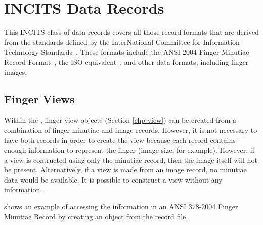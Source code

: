 \section{INCITS Data Records}
\label{sec-incitsdatarecords}

This INCITS class of data records covers all those record formats that are
derived from the standards defined by the InterNational Committee for
Information Technology Standards~\cite{incits}. These formats include the
ANSI-2004 Finger Minutiae Record Format~\cite{std:ansi378-2004}, the ISO
equivalent~\cite{std:iso19794-2}, and other data formats, including finger
images.

\subsection{Finger Views}
\label{sec-incitsfingerviews}
Within the \sname, finger view objects (Section \ref{chp-view}) can be 
created from a combination of finger minutiae and image records. However, it
is not necessary to have both records in order to create the view because each
record contains enough information to represent the finger (image size, for
example). However, if a view is contructed using only the minutiae record, then
the image itself will not be present. Alternatively, if a view is made from
an image record, no minutiae data would be available. It is possible to
construct a view without any information.

 shows an example of accessing the information
in an ANSI 378-2004 Finger Minutiae Record by creating an 
object from the record file.
